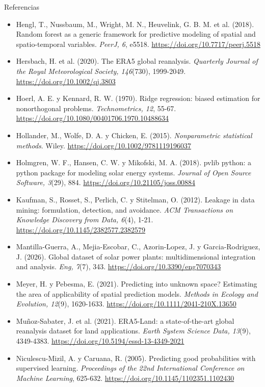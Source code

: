 \documentclass[aspectratio=169,10pt]{beamer}
\begin{document}
\begin{frame}[allowframebreaks]{Referencias}
\begin{itemize}
    \item Hengl, T., Nussbaum, M., Wright, M. N., Heuvelink, G. B. M. et al. (2018). Random forest as a generic framework for predictive modeling of spatial and spatio-temporal variables. \textit{PeerJ, 6}, e5518. \url{https://doi.org/10.7717/peerj.5518}
    \item Hersbach, H. et al. (2020). The ERA5 global reanalysis. \textit{Quarterly Journal of the Royal Meteorological Society, 146}(730), 1999-2049. \url{https://doi.org/10.1002/qj.3803}
    \item Hoerl, A. E. y Kennard, R. W. (1970). Ridge regression: biased estimation for nonorthogonal problems. \textit{Technometrics, 12}, 55-67. \url{https://doi.org/10.1080/00401706.1970.10488634}
    \item Hollander, M., Wolfe, D. A. y Chicken, E. (2015). \textit{Nonparametric statistical methods}. Wiley. \url{https://doi.org/10.1002/9781119196037}
    \item Holmgren, W. F., Hansen, C. W. y Mikofski, M. A. (2018). pvlib python: a python package for modeling solar energy systems. \textit{Journal of Open Source Software, 3}(29), 884. \url{https://doi.org/10.21105/joss.00884}
    \item Kaufman, S., Rosset, S., Perlich, C. y Stitelman, O. (2012). Leakage in data mining: formulation, detection, and avoidance. \textit{ACM Transactions on Knowledge Discovery from Data, 6}(4), 1-21. \url{https://doi.org/10.1145/2382577.2382579}
    \item Mantilla-Guerra, A., Mejia-Escobar, C., Azorin-Lopez, J. y Garcia-Rodriguez, J. (2026). Global dataset of solar power plants: multidimensional integration and analysis. \textit{Eng, 7}(7), 343. \url{https://doi.org/10.3390/eng7070343}
    \item Meyer, H. y Pebesma, E. (2021). Predicting into unknown space? Estimating the area of applicability of spatial prediction models. \textit{Methods in Ecology and Evolution, 12}(9), 1620-1633. \url{https://doi.org/10.1111/2041-210X.13650}
    \item Muñoz-Sabater, J. et al. (2021). ERA5-Land: a state-of-the-art global reanalysis dataset for land applications. \textit{Earth System Science Data, 13}(9), 4349-4383. \url{https://doi.org/10.5194/essd-13-4349-2021}
    \item Niculescu-Mizil, A. y Caruana, R. (2005). Predicting good probabilities with supervised learning. \textit{Proceedings of the 22nd International Conference on Machine Learning}, 625-632. \url{https://doi.org/10.1145/1102351.1102430}

\end{itemize}
\end{frame}
\end{document}

